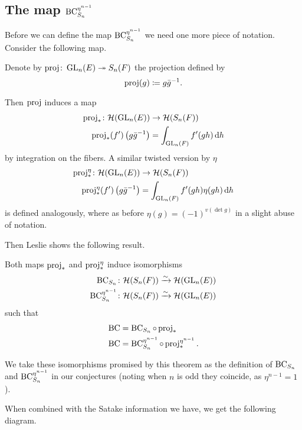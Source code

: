 \subsection{The map $\operatorname{BC}^{\eta^{n-1}}_{S_n}$}
Before we can define the map $\operatorname{BC}^{\eta^{n-1}}_{S_n}$
we need one more piece of notation.
Consider the following map.
\begin{definition}
  [$\rproj$]
  Denote by $\operatorname{proj} \colon \operatorname{GL}_n(E) \twoheadrightarrow S_n(F)$ the projection defined by
  \[ \operatorname{proj}(g) \coloneqq g \bar{g}^{-1}. \]
\end{definition}
Then $\rproj$ induces a map
\begin{align*}
  \rproj_\ast \colon \HH(\GL_n(E)) &\to \HH(S_n(F)) \\
  \rproj_\ast(f')\left( g\bar{g}\inv \right) &= \int_{\GL_n(F)} f'(gh) \odif h
\end{align*}
by integration on the fibers.
A similar twisted version by $\eta$
\begin{align*}
  \rproj_\ast^\eta \colon \HH(\GL_n(E)) &\to \HH(S_n(F)) \\
  \rproj_\ast^\eta(f')\left( g\bar{g}\inv \right) &= \int_{\GL_n(F)} f'(gh) \eta(gh) \odif h
\end{align*}
is defined analogously,
where as before $\eta(g) = (-1)^{v(\det g)}$ in a slight abuse of notation.

Then Leslie \cite{ref:leslie} shows the following result.
\begin{theorem}
  Both maps $\operatorname{proj}_\ast$ and $\operatorname{proj}_\ast^\eta$ induce isomorphisms
  \begin{align*}
    \operatorname{BC}_{S_n} \colon \mathcal H(S_n(F)) &\xrightarrow{\sim} \mathcal H(\operatorname{GL}_n(E)) \\
    \operatorname{BC}^{\eta^{n-1}}_{S_n} \colon \mathcal H(S_n(F)) &\xrightarrow{\sim} \mathcal H(\operatorname{GL}_n(E))
  \end{align*}
  such that
  \begin{align*}
    \operatorname{BC} &= \operatorname{BC}_{S_n} \circ \operatorname{proj}_\ast \\
    \operatorname{BC} &= \operatorname{BC}^{\eta^{n-1}}_{S_n} \circ \operatorname{proj}_\ast^{\eta^{n-1}}.
  \end{align*}
\end{theorem}
We take these isomorphisms promised by this theorem
as the definition of $\operatorname{BC}_{S_n}$ and $\operatorname{BC}^{\eta^{n-1}}_{S_n}$ in our conjectures
(noting when $n$ is odd they coincide, as $\eta^{n-1} = 1$).

When combined with the Satake information we have, we get the following diagram.
\begin{center}
\end{center}

